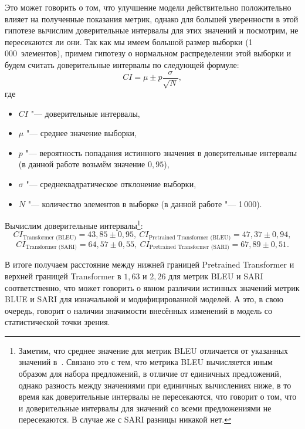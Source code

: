 Это может говорить о том, что улучшение модели действительно положительно влияет на полученные показания метрик, однако для большей уверенности в этой гипотезе вычислим доверительные интервалы для этих значений и посмотрим, не пересекаются ли они.
Так как мы имеем большой размер выборки (1\,000~элементов), примем гипотезу о нормальном распределении этой выборки и будем считать доверительные интервалы по следующей формуле:
\begin{equation}%
  \label{ci-formula}
  CI = \mu \pm p \frac{\sigma}{\sqrt{N}},
\end{equation}
где
\begin{itemize}%
  \item $CI$ "--- доверительные интервалы,
  \item $\mu$ "--- среднее значение выборки,
  \item $p$ "--- вероятность попадания истинного значения в доверительные интервалы (в данной работе возьмём значение $0{,}95$),
  \item $\sigma$ "--- среднеквадратическое отклонение выборки,
  \item $N$ "--- количество элементов в выборке (в данной работе "--- 1\,000).
\end{itemize}

Вычислим доверительные интервалы\footnote{Заметим, что среднее значение для метрик BLEU отличается от указанных значений в~. Связано это с тем, что метрика BLEU вычисляется иным образом для набора предложений, в отличие от единичных предложений, однако разность между значениями при единичных вычислениях ниже, в то время как доверительные интервалы не пересекаются, что говорит о том, что и доверительные интервалы для значений со всеми предложениями не пересекаются. В случае же с SARI разницы никакой нет.}:
\begin{equation}\label{bleu-ci}%
  CI_{\text{Transformer (BLEU)}} = 43{,}85 \pm 0{,}95, \
  CI_{\text{Pretrained Transformer (BLEU)}} = 47{,}37 \pm 0{,}94,
\end{equation}
\begin{equation}\label{sari-ci}%
  CI_{\text{Transformer (SARI)}} = 64{,}57 \pm 0{,}55, \
  CI_{\text{Pretrained Transformer (SARI)}} = 67{,}89 \pm 0{,}51.
\end{equation}

В итоге получаем расстояние между нижней границей Pretrained Transformer и верхней границей Transformer в $1{,}63$ и $2{,}26$ для метрик BLEU и SARI соответственно, что может говорить о явном различии истинных значений метрик BLUE и SARI для изначальной и модифицированной моделей.
А это, в свою очередь, говорит о наличии значимости внесённых изменений в модель со статистической точки зрения.


